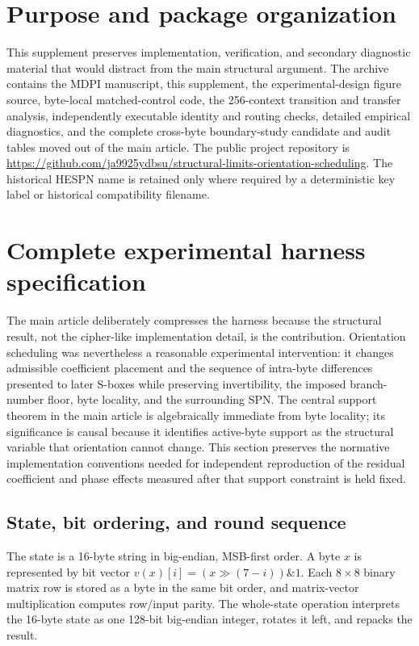\documentclass[cryptography,supfile,submit,oneauthor]{Definitions/mdpi}
\begin{document}
\section{Purpose and package organization}
This supplement preserves implementation, verification, and secondary diagnostic material that would distract from the main structural argument. The archive contains the MDPI manuscript, this supplement, the experimental-design figure source, byte-local matched-control code, the 256-context transition and transfer analysis, independently executable identity and routing checks, detailed empirical diagnostics, and the complete cross-byte boundary-study candidate and audit tables moved out of the main article. The public project repository is \url{https://github.com/ja9925ydbsu/structural-limits-orientation-scheduling}. The historical HESPN name is retained only where required by a deterministic key label or historical compatibility filename.

\section{Complete experimental harness specification}
The main article deliberately compresses the harness because the structural result, not the cipher-like implementation detail, is the contribution. Orientation scheduling was nevertheless a reasonable experimental intervention: it changes admissible coefficient placement and the sequence of intra-byte differences presented to later S-boxes while preserving invertibility, the imposed branch-number floor, byte locality, and the surrounding SPN. The central support theorem in the main article is algebraically immediate from byte locality; its significance is causal because it identifies active-byte support as the structural variable that orientation cannot change. This section preserves the normative implementation conventions needed for independent reproduction of the residual coefficient and phase effects measured after that support constraint is held fixed.

\subsection{State, bit ordering, and round sequence}
The state is a 16-byte string in big-endian, MSB-first order. A byte $x$ is represented by bit vector $v(x)[i]=(x\gg(7-i))\mathbin{\&}1$. Each $8\times8$ binary matrix row is stored as a byte in the same bit order, and matrix-vector multiplication computes row/input parity. The whole-state operation  interprets the 16-byte state as one 128-bit big-endian integer, rotates it left, and repacks the result.
\end{document}
